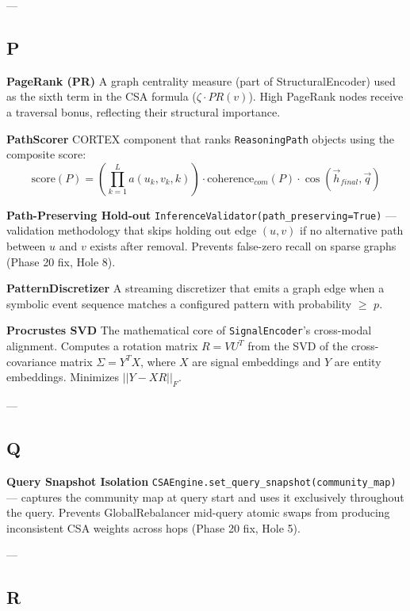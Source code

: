 \documentclass[11pt,article,oneside]{memoir}
\begin{document}
---

\subsection{P}

\textbf{PageRank (PR)}
A graph centrality measure (part of StructuralEncoder) used as the sixth term in the CSA formula ($\zeta \cdot PR(v)$). High PageRank nodes receive a traversal bonus, reflecting their structural importance.

\textbf{PathScorer}
CORTEX component that ranks \texttt{ReasoningPath} objects using the composite score:
\begin{equation}
\text{score}(P) = \left(\prod_{k=1}^L a(u_k, v_k, k)\right) \cdot \text{coherence}_{com}(P) \cdot \cos(\vec{h}_{final}, \vec{q})
\end{equation}

\textbf{Path-Preserving Hold-out}
\texttt{InferenceValidator(path\_preserving=True)} — validation methodology that skips holding out edge $(u,v)$ if no alternative path between $u$ and $v$ exists after removal. Prevents false-zero recall on sparse graphs (Phase 20 fix, Hole 8).

\textbf{PatternDiscre\-tizer}
A streaming discretizer that emits a graph edge when a symbolic event sequence matches a configured pattern with probability $\ge$ $p$.

\textbf{Procrustes SVD}
The mathe\-matical core of \texttt{SignalEncoder}'s cross-modal alignment. Computes a rotation matrix $R = V U^T$ from the SVD of the cross-covariance matrix $\Sigma = Y^T X$, where $X$ are signal embeddings and $Y$ are entity embeddings. Minimizes $||Y - XR||_F$.

---

\subsection{Q}

\textbf{Query Snapshot Isolation}
\texttt{CSAEngine.set\_query\_snapshot(community\_map)} — captures the community map at query start and uses it exclusively throughout the query. Prevents GlobalRebalancer mid-query atomic swaps from producing incon\-sistent CSA weights across hops (Phase 20 fix, Hole 5).

---

\subsection{R}
\end{document}
